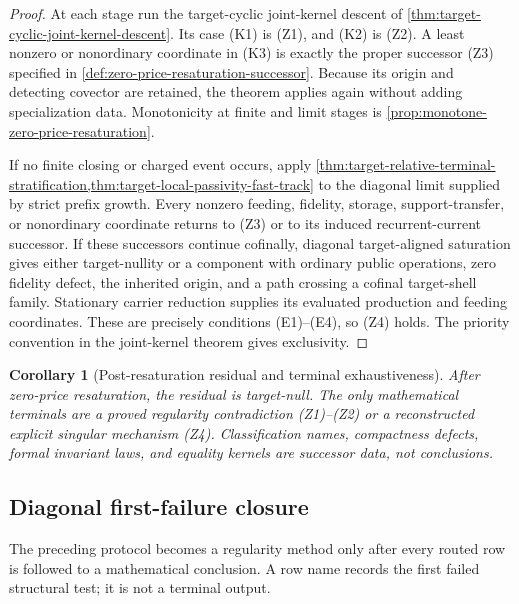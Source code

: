 \documentclass[11pt]{article}
\numberwithin{section}{part}
\theoremstyle{plain}
\newtheorem{corollary}[corollary]{Corollary}
\theoremstyle{definition}
\theoremstyle{remark}
\begin{document}
\begin{proof}
At each stage run the target-cyclic joint-kernel descent of
\cref{thm:target-cyclic-joint-kernel-descent}.  Its case \textup{(K1)} is
\textup{(Z1)}, and \textup{(K2)} is \textup{(Z2)}.  A least nonzero or
nonordinary coordinate in \textup{(K3)} is exactly the proper successor
\textup{(Z3)} specified in
\cref{def:zero-price-resaturation-successor}.  Because its origin and
detecting covector are retained, the theorem applies again without adding
specialization data.  Monotonicity at finite and limit stages is
\cref{prop:monotone-zero-price-resaturation}.

If no finite closing or charged event occurs, apply
\cref{thm:target-relative-terminal-stratification,thm:target-local-passivity-fast-track}
to the diagonal limit supplied by strict prefix growth.  Every nonzero
feeding, fidelity, storage, support-transfer, or nonordinary coordinate
returns to \textup{(Z3)} or to its induced recurrent-current successor.  If
these successors continue cofinally, diagonal target-aligned saturation
gives either target-nullity or a component with ordinary public operations,
zero fidelity defect, the inherited origin, and a path crossing a cofinal
target-shell family.  Stationary carrier reduction supplies its evaluated
production and feeding coordinates.  These are precisely conditions
\textup{(E1)}--\textup{(E4)}, so \textup{(Z4)} holds.  The priority
convention in the joint-kernel theorem gives exclusivity.
\end{proof}

\begin{corollary}[Post-resaturation residual and terminal exhaustiveness]
\label{cor:post-resaturation-terminal-exhaustiveness}
After zero-price resaturation, the residual is target-null.  The only
mathematical terminals are a proved regularity contradiction
\textup{(Z1)}--\textup{(Z2)} or a reconstructed explicit singular mechanism
\textup{(Z4)}.  Classification names, compactness defects, formal invariant
laws, and equality kernels are successor data, not conclusions.
\end{corollary}

\subsection{Diagonal first-failure closure}
\label{subsec:ranked-first-failure-closure}

The preceding protocol becomes a regularity method only after every routed
row is followed to a mathematical conclusion.  A row name records the first
failed structural test; it is not a terminal output.
\end{document}
